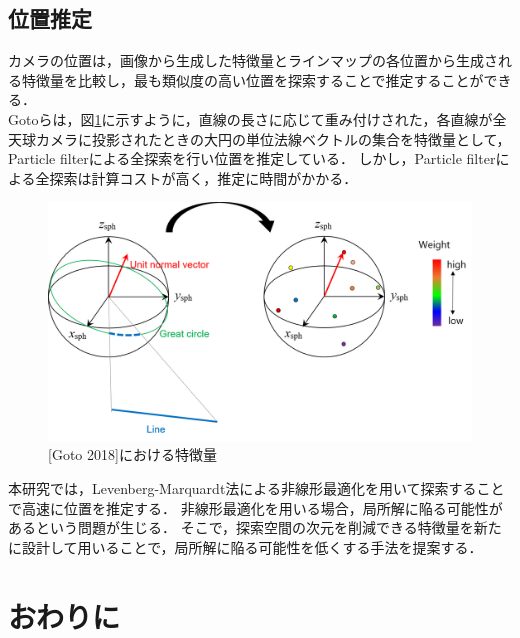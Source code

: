 \newpage
\subsection{位置推定}

カメラの位置は，画像から生成した特徴量とラインマップの各位置から生成される特徴量を比較し，最も類似度の高い位置を探索することで推定することができる．
\\

Gotoらは，図\ref{fig:descriptor}に示すように，直線の長さに応じて重み付けされた，各直線が全天球カメラに投影されたときの大円の単位法線ベクトルの集合を特徴量として，Particle filter\mbox{\cite{Arulampalam2002}}\mbox{\cite{Arulampalam2004}}による全探索を行い位置を推定している\mbox{\cite{Goto2018}}．
しかし，Particle filterによる全探索は計算コストが高く，推定に時間がかかる．
\\

\begin{figure}[b]
 \begin{center}
 \includegraphics[width=0.9\columnwidth]{./chap2/fig/descriptor.png}
 \caption{[Goto 2018]における特徴量}
 \label{fig:descriptor}
 \end{center}
\end{figure}

本研究では，Levenberg-Marquardt法による非線形最適化を用いて探索することで高速に位置を推定する．
非線形最適化を用いる場合，局所解に陥る可能性があるという問題が生じる．
そこで，探索空間の次元を削減できる特徴量を新たに設計して用いることで，局所解に陥る可能性を低くする手法を提案する．


\clearpage
\section{おわりに}

